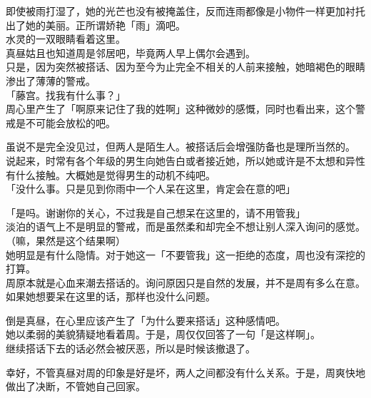 即使被雨打湿了，她的光芒也没有被掩盖住，反而连雨都像是小物件一样更加衬托出了她的美丽。正所谓娇艳「雨」滴吧。\\

水灵的一双眼睛看着这里。\\

真昼姑且也知道周是邻居吧，毕竟两人早上偶尔会遇到。\\

只是，因为突然被搭话、因为至今为止完全不相关的人前来接触，她暗褐色的眼睛渗出了薄薄的警戒。\\

「藤宫。找我有什么事？」\\

周心里产生了「啊原来记住了我的姓啊」这种微妙的感慨，同时也看出来，这个警戒是不可能会放松的吧。

虽说不是完全没见过，但两人是陌生人。被搭话后会增强防备也是理所当然的。\\

说起来，时常有各个年级的男生向她告白或者接近她，所以她或许是不太想和异性有什么接触。大概她是觉得男生的动机不纯吧。\\

「没什么事。只是见到你雨中一个人呆在这里，肯定会在意的吧」

「是吗。谢谢你的关心，不过我是自己想呆在这里的，请不用管我」\\

淡泊的语气上不是明显的警戒，而是虽然柔和却完全不想让别人深入询问的感觉。\\

（嘛，果然是这个结果啊）\\

她明显是有什么隐情。对于她这一「不要管我」这一拒绝的态度，周也没有深挖的打算。\\

周原本就是心血来潮去搭话的。询问原因只是自然的发展，并不是周有多么在意。\\

如果她想要呆在这里的话，那样也没什么问题。

倒是真昼，在心里应该产生了「为什么要来搭话」这种感情吧。\\

她以柔弱的美貌猜疑地看着周。于是，周仅仅回答了一句「是这样啊」。\\

继续搭话下去的话必然会被厌恶，所以是时候该撤退了。

幸好，不管真昼对周的印象是好是坏，两人之间都没有什么关系。于是，周爽快地做出了决断，不管她自己回家。\\

